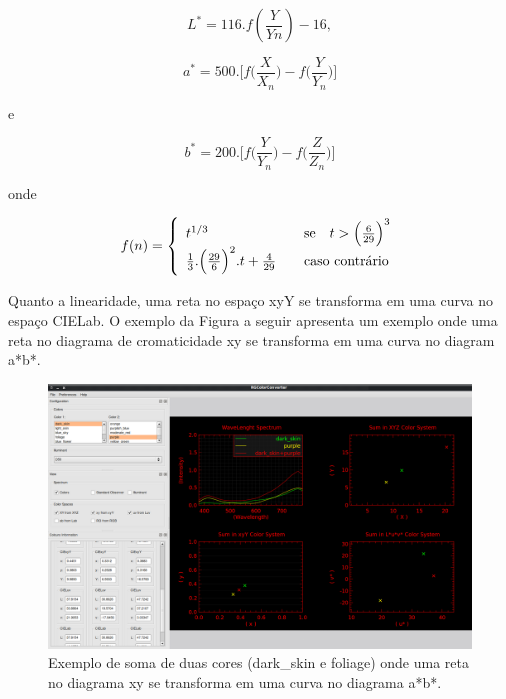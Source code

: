 \documentclass[a4paper,10pt]{report}
\begin{document}
\begin{equation}\label{eq:L*a*b*_L*}
L^*=116.f(\frac{Y}{Yn})-16,
\end{equation}

\begin{equation}\label{eq:L*a*b*_a*}
a^*=500.\Big[f\Big(\frac{X}{X_n}\Big)-f\Big(\frac{Y}{Y_n}\Big)\Big]
\end{equation}

e

\begin{equation}\label{eq:L*a*b*_b*}
b^*=200.\Big[f\Big(\frac{Y}{Y_n}\Big)-f\Big(\frac{Z}{Z_n}\Big)\Big]
\end{equation}

onde

\[
f(n) = \left\{ 
  \begin{array}{l l}
    t^{1/3} & \quad \text{se} \quad t > \Big(\frac{6}{29}\Big)^3\\
    \frac{1}{3}.\Big(\frac{29}{6}\Big)^2.t+\frac{4}{29} & 
\quad \text{caso contrário}\\
  \end{array} \right.
\]

\par
Quanto a linearidade, uma reta no espaço xyY se transforma em uma curva no
espaço CIELab. O exemplo da Figura a seguir apresenta um exemplo onde uma reta
no diagrama de cromaticidade xy se transforma em uma curva no diagram a*b*.

\begin{figure}[!htb]
     \centering
     \includegraphics[scale=0.6]{img/luv_no_linearity.png}
     \caption{Exemplo de soma de duas cores (dark_skin e foliage) onde uma reta
no diagrama xy se transforma em uma curva no diagrama a*b*.}
     \label{fig:luv_no_linearity}
\end{figure}
\end{document}
